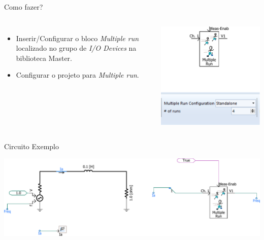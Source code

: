 \begin{frame}{Como fazer?}
\centering

\begin{columns}



\begin{itemize}
\item Inserir/Configurar o bloco {\it Multiple run} localizado no grupo de {\it I/O Devices} na biblioteca Master.

\vspace*{2.5cm}

\item Configurar o projeto para {\it Multiple run}.

\vspace*{1cm}
\end{itemize}


\includegraphics[width=0.80\linewidth]{./figuras/Automacao/multrun}

\end{columns}

\end{frame}




\begin{frame}{Circuito Exemplo}
\centering

\includegraphics[width=0.85\linewidth]{./figuras/Automacao/SIM}

\end{frame}